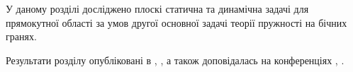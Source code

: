 У даному розділі досліджено плоскі статична та динамічна задачі для прямокутної області
за умов другої основної задачі теорії пружності на бічних гранях.

Результати розділу опубліковані в \cite{pozhylenkov_4}, \cite{pozhylenkov_6}, а також доповідалась на конференціях \cite{conf_3}, \cite{conf_5}.